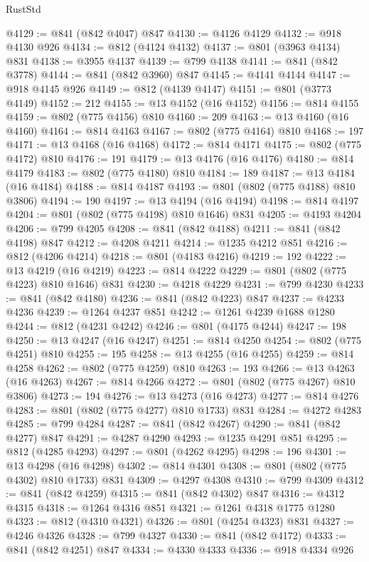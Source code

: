 \begin{lexlean}{RustStd}
\begin{coremodule}
@4129 := @841 (@842 @4047) @847
@4130 := @4126 @4129
@4132 := @918 @4130 @926
@4134 := @812 (@4124 @4132)
@4137 := @801 (@3963 @4134) @831
@4138 := @3955 @4137
@4139 := @799 @4138
@4141 := @841 (@842 @3778)
@4144 := @841 (@842 @3960) @847
@4145 := @4141 @4144
@4147 := @918 @4145 @926
@4149 := @812 (@4139 @4147)
@4151 := @801 (@3773 @4149)
@4152 := 212
@4155 := @13 @4152 (@16 @4152)
@4156 := @814 @4155
@4159 := @802 (@775 @4156) @810
@4160 := 209
@4163 := @13 @4160 (@16 @4160)
@4164 := @814 @4163
@4167 := @802 (@775 @4164) @810
@4168 := 197
@4171 := @13 @4168 (@16 @4168)
@4172 := @814 @4171
@4175 := @802 (@775 @4172) @810
@4176 := 191
@4179 := @13 @4176 (@16 @4176)
@4180 := @814 @4179
@4183 := @802 (@775 @4180) @810
@4184 := 189
@4187 := @13 @4184 (@16 @4184)
@4188 := @814 @4187
@4193 := @801 (@802 (@775 @4188) @810 @3806)
@4194 := 190
@4197 := @13 @4194 (@16 @4194)
@4198 := @814 @4197
@4204 := @801 (@802 (@775 @4198) @810 @1646) @831
@4205 := @4193 @4204
@4206 := @799 @4205
@4208 := @841 (@842 @4188)
@4211 := @841 (@842 @4198) @847
@4212 := @4208 @4211
@4214 := @1235 @4212 @851
@4216 := @812 (@4206 @4214)
@4218 := @801 (@4183 @4216)
@4219 := 192
@4222 := @13 @4219 (@16 @4219)
@4223 := @814 @4222
@4229 := @801 (@802 (@775 @4223) @810 @1646) @831
@4230 := @4218 @4229
@4231 := @799 @4230
@4233 := @841 (@842 @4180)
@4236 := @841 (@842 @4223) @847
@4237 := @4233 @4236
@4239 := @1264 @4237 @851
@4242 := @1261 @4239 @1688 @1280
@4244 := @812 (@4231 @4242)
@4246 := @801 (@4175 @4244)
@4247 := 198
@4250 := @13 @4247 (@16 @4247)
@4251 := @814 @4250
@4254 := @802 (@775 @4251) @810
@4255 := 195
@4258 := @13 @4255 (@16 @4255)
@4259 := @814 @4258
@4262 := @802 (@775 @4259) @810
@4263 := 193
@4266 := @13 @4263 (@16 @4263)
@4267 := @814 @4266
@4272 := @801 (@802 (@775 @4267) @810 @3806)
@4273 := 194
@4276 := @13 @4273 (@16 @4273)
@4277 := @814 @4276
@4283 := @801 (@802 (@775 @4277) @810 @1733) @831
@4284 := @4272 @4283
@4285 := @799 @4284
@4287 := @841 (@842 @4267)
@4290 := @841 (@842 @4277) @847
@4291 := @4287 @4290
@4293 := @1235 @4291 @851
@4295 := @812 (@4285 @4293)
@4297 := @801 (@4262 @4295)
@4298 := 196
@4301 := @13 @4298 (@16 @4298)
@4302 := @814 @4301
@4308 := @801 (@802 (@775 @4302) @810 @1733) @831
@4309 := @4297 @4308
@4310 := @799 @4309
@4312 := @841 (@842 @4259)
@4315 := @841 (@842 @4302) @847
@4316 := @4312 @4315
@4318 := @1264 @4316 @851
@4321 := @1261 @4318 @1775 @1280
@4323 := @812 (@4310 @4321)
@4326 := @801 (@4254 @4323) @831
@4327 := @4246 @4326
@4328 := @799 @4327
@4330 := @841 (@842 @4172)
@4333 := @841 (@842 @4251) @847
@4334 := @4330 @4333
@4336 := @918 @4334 @926

\end{coremodule}
\end{lexlean}
